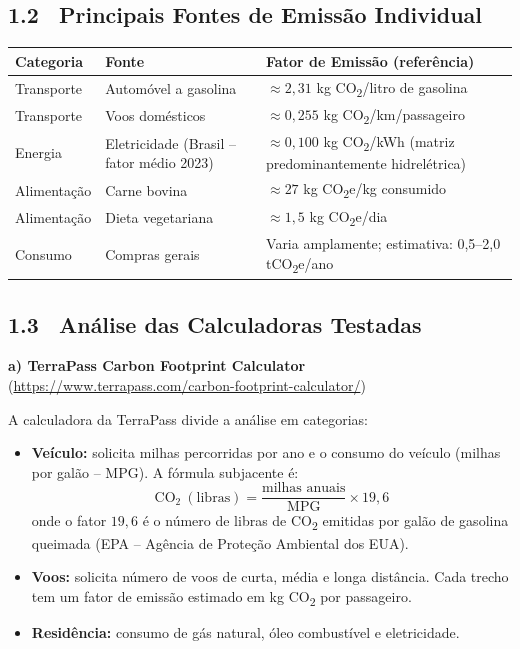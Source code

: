 \documentclass[12pt,a4paper]{article}
\begin{document}
\bigskip

\subsection*{1.2 \ Principais Fontes de Emissão Individual}

\begin{center}
\renewcommand{\arraystretch}{1.5}
\begin{tabular}{l l p{6.5cm}}
  \toprule
  \textbf{Categoria} & \textbf{Fonte} & \textbf{Fator de Emissão (referência)}\\ \midrule
  Transporte & Automóvel a gasolina &
    $\approx 2{,}31$ kg CO\textsubscript{2}/litro de gasolina\\
  Transporte & Voos domésticos &
    $\approx 0{,}255$ kg CO\textsubscript{2}/km/passageiro\\
  Energia & Eletricidade (Brasil -- fator médio 2023) &
    $\approx 0{,}100$ kg CO\textsubscript{2}/kWh (matriz predominantemente hidrelétrica)\\
  Alimentação & Carne bovina &
    $\approx 27$ kg CO\textsubscript{2}e/kg consumido\\
  Alimentação & Dieta vegetariana &
    $\approx 1{,}5$ kg CO\textsubscript{2}e/dia\\
  Consumo & Compras gerais &
    Varia amplamente; estimativa: 0,5--2,0 tCO\textsubscript{2}e/ano\\
  \bottomrule
\end{tabular}
\end{center}

\bigskip

\subsection*{1.3 \ Análise das Calculadoras Testadas}

\textbf{a) TerraPass Carbon Footprint Calculator}
(\url{https://www.terrapass.com/carbon-footprint-calculator/})

A calculadora da TerraPass divide a análise em categorias:
\begin{itemize}
  \item \textbf{Veículo:} solicita milhas percorridas por ano e o consumo do veículo
  (milhas por galão -- MPG). A fórmula subjacente é:
  \[
    \text{CO}_2\ (\text{libras}) =
    \frac{\text{milhas anuais}}{\text{MPG}} \times 19{,}6
  \]
  onde o fator $19{,}6$ é o número de libras de CO\textsubscript{2} emitidas por galão
  de gasolina queimada (EPA -- Agência de Proteção Ambiental dos EUA).

  \item \textbf{Voos:} solicita número de voos de curta, média e longa distância.
  Cada trecho tem um fator de emissão estimado em kg CO\textsubscript{2} por passageiro.

  \item \textbf{Residência:} consumo de gás natural, óleo combustível e eletricidade.
\end{itemize}
\end{document}
